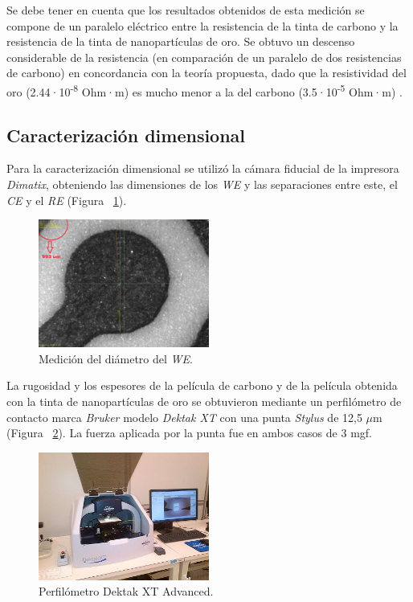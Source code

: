 Se debe tener en cuenta que los resultados obtenidos de esta medición se compone de un paralelo eléctrico entre la resistencia de la tinta de carbono y la resistencia de la tinta de nanopartículas de oro. Se obtuvo un descenso considerable de la resistencia (en comparación de un paralelo de dos resistencias de carbono) en concordancia con la teoría propuesta, dado que la resistividad del oro (2.44·10\textsuperscript{-8} Ohm·m) es mucho menor a la del carbono (3.5·10\textsuperscript{-5} Ohm·m) \cite{Resistividad}.

\subsection{Caracterización dimensional}
Para la caracterización dimensional se utilizó la cámara fiducial de la impresora \textit{Dimatix}, obteniendo las dimensiones de los \emph{WE} y las separaciones entre este, el \emph{CE} y el \emph{RE} (Figura ~\ref{fig:Figura_medicion_WE}).

\begin{figure}[H]
  \centering
    \includegraphics[width=0.5\textwidth]{Figuras/Figura_medicion_WE}
  \caption{Medición del diámetro del \emph{WE}.}
  \label{fig:Figura_medicion_WE}
\end{figure}

La rugosidad y los espesores de la película de carbono y de la película obtenida con la tinta de nanopartículas de oro se obtuvieron mediante un perfilómetro de contacto marca \textit{Bruker} modelo \textit{Dektak XT} con una punta \textit{Stylus} de 12,5  $\mu$m (Figura ~\ref{fig:Figura_Perfilometro}). La fuerza aplicada por la punta fue en ambos casos de 3 mgf.

\begin{figure}[H]
  \centering
    \includegraphics[width=0.5\textwidth]{Figuras/Figura_Perfilometro}
  \caption{Perfilómetro Dektak XT Advanced.}
  \label{fig:Figura_Perfilometro}
\end{figure}

